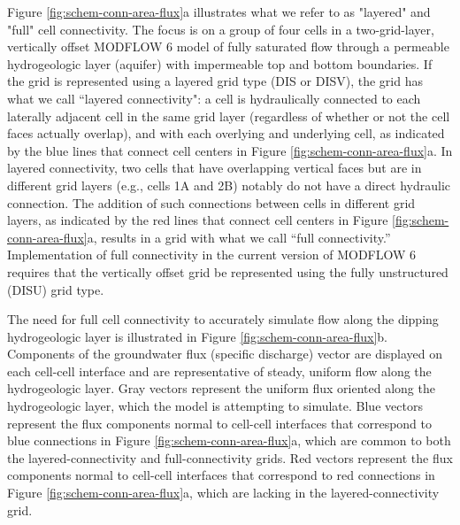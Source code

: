 \documentclass{article}
\begin{document}
Figure \ref{fig:schem-conn-area-flux}a illustrates what we refer to as "layered" and "full" cell connectivity. The focus is on a group of four cells in a two-grid-layer, vertically offset MODFLOW 6 model of fully saturated flow through a permeable hydrogeologic layer (aquifer) with impermeable top and bottom boundaries. If the grid is represented using a layered grid type (DIS or DISV), the grid has what we call ``layered connectivity": a cell is hydraulically connected to each laterally adjacent cell in the same grid layer (regardless of whether or not the cell faces actually overlap), and with each overlying and underlying cell, as indicated by the blue lines that connect cell centers in Figure \ref{fig:schem-conn-area-flux}a. In layered connectivity, two cells that have overlapping vertical faces but are in different grid layers (e.g., cells 1A and 2B) notably do not have a direct hydraulic connection. The addition of such connections between cells in different grid layers, as indicated by the red lines that connect cell centers in Figure \ref{fig:schem-conn-area-flux}a, results in a grid with what we call ``full connectivity.''  Implementation of full connectivity in the current version of MODFLOW 6 \citep{modflow650software} requires that the vertically offset grid be represented using the fully unstructured (DISU) grid type.

The need for full cell connectivity to accurately simulate flow along the dipping hydrogeologic layer is illustrated in Figure \ref{fig:schem-conn-area-flux}b. Components of the groundwater flux (specific discharge) vector are displayed on each cell-cell interface and are representative of steady, uniform flow along the hydrogeologic layer. Gray vectors represent the uniform flux oriented along the hydrogeologic layer, which the model is attempting to simulate. Blue vectors represent the flux components normal to cell-cell interfaces that correspond to blue connections in Figure \ref{fig:schem-conn-area-flux}a, which are common to both the layered-connectivity and full-connectivity grids. Red vectors represent the flux components normal to cell-cell interfaces that correspond to red connections in Figure \ref{fig:schem-conn-area-flux}a, which are lacking in the layered-connectivity grid.
\end{document}
